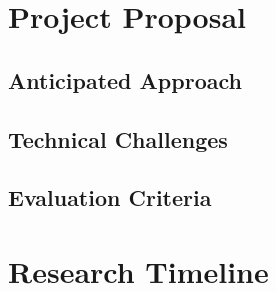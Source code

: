 \documentclass{sig-alternate}
\begin{document}
\section{Project Proposal}
\label{sec:project_proposal}


\subsection{Anticipated Approach}
\label{subsec:approach}


\subsection{Technical Challenges}
\label{subsec:tech_challenges}


\subsection{Evaluation Criteria}
\label{subsec:eval_criteria}


\section{Research Timeline}
\label{sec:research_timeline}


\end{document}
